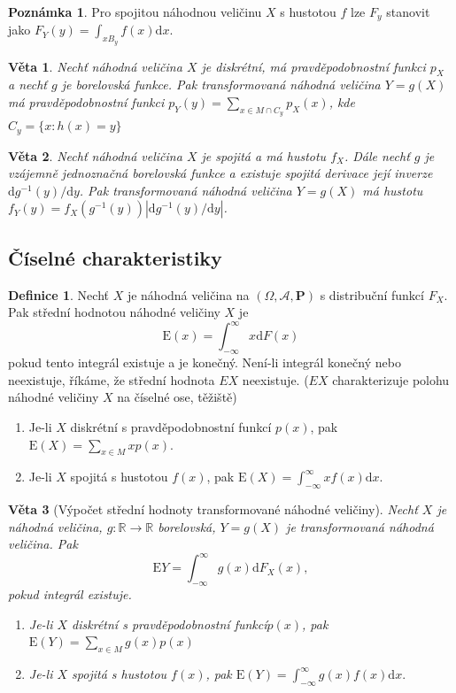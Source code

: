 \documentclass[a4]{report}
\newtheorem{theorem}{Věta}
\theoremstyle{definition}
\newtheorem{definition}{Definice}[section]
\newtheorem{notes}{Poznámka}[section]
\begin{document}
{\begin{notes}
Pro spojitou náhodnou veličinu $X$ s hustotou $f$ lze $F_y$ stanovit jako $F_Y(y)=\int_{xB_y} f(x)\mathrm{d}x.$
\end{notes}

\begin{theorem}
Nechť náhodná veličina $X$ je diskrétní, má pravděpodobnostní  funkci $p_X$ a nechť $g$ je borelovská funkce. Pak transformovaná náhodná veličina $Y=g(X)$ má pravděpodobnostní funkci $p_Y(y)=\sum_{x\in M \cap C_y}p_X(x)$, kde $C_y=\{x:h(x)=y\}$
\end{theorem}

\begin{theorem}
Nechť náhodná veličina $X$ je spojitá a má hustotu $f_X$. Dále nechť $g$ je vzájemně jednoznačná borelovská funkce a existuje spojitá derivace její inverze $\mathrm{d}g^{-1}(y)/\mathrm{d}y$. Pak transformovaná náhodná veličina $Y=g(X)$ má hustotu $f_Y(y)=f_X(g^{-1}(y))|\mathrm{d}g^{-1}(y)/\mathrm{d}y|$. 
\end{theorem}

\subsection{Číselné charakteristiky}
\begin{definition}
Nechť $X$ je náhodná veličina na $(\Omega,\mathcal{A},\textbf{P})$ s distribuční funkcí $F_X$. Pak střední hodnotou náhodné veličiny $X$ je
\begin{equation}
\mathrm{E}(x)=\int_{-\infty}^{\infty} x\mathrm{d}F(x)
\end{equation}
pokud tento integrál existuje a je konečný. Není-li integrál konečný nebo neexistuje, říkáme, že střední hodnota $EX$ neexistuje. ($EX$ charakterizuje polohu náhodné veličiny $X$ na číselné ose, těžiště)
\end{definition}

\begin{enumerate}
\item Je-li $X$ diskrétní s pravděpodobnostní funkcí $p(x)$, pak $\mathrm{E}(X)=\sum_{x\in M}xp(x).$
\item Je-li $X$ spojitá s hustotou $f(x)$, pak $\mathrm{E}(X)=\int_{-\infty}^{\infty} x f(x)\mathrm{d}x .$
\end{enumerate}

\begin{theorem}[Výpočet střední hodnoty transformované náhodné veličiny]
Nechť $X$ je náhodná veličina, $g:\mathbb{R}\rightarrow \mathbb{R}$ borelovská, $Y=g(X)$ je transformovaná náhodná veličina. Pak
\begin{equation}
\mathrm{E}Y=\int_{-\infty}^{\infty}g(x)\mathrm{d}F_X(x),
\end{equation}
pokud integrál existuje.
\begin{enumerate}
\item Je-li $X$ diskrétní s pravděpodobnostní funkcí$p(x)$, pak $\mathrm{E}(Y)=\sum_{x\in M} g(x)p(x)$
\item Je-li $X$ spojitá s hustotou $f(x)$, pak $\mathrm{E}(Y)=\int_{-\infty}^{\infty} g(x)f(x)\mathrm{d}x.$
\end{enumerate}
\end{theorem}

}
\end{document}
